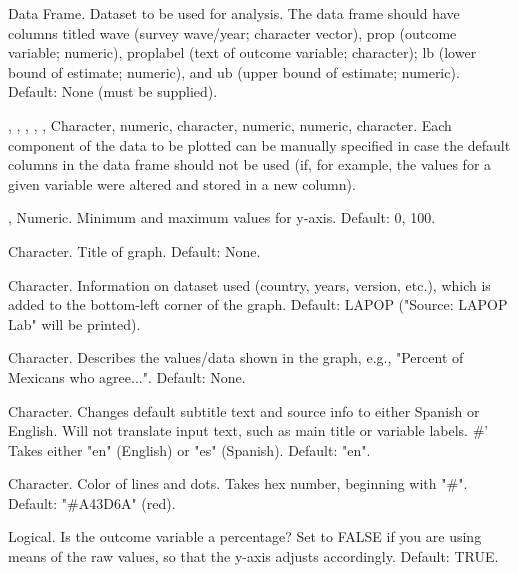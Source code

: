 \documentclass[a4paper]{book}
\begin{document}
\begin{Arguments}
\begin{ldescription}
\item[\code{data}] Data Frame. Dataset to be used for analysis.  The data frame should have columns
titled wave (survey wave/year; character vector), prop (outcome variable; numeric),
proplabel (text of outcome variable; character); lb (lower bound of estimate; numeric),
and ub (upper bound of estimate; numeric). Default: None (must be supplied).

\item[\code{wave\_var}, \code{outcome\_var}, \code{label\_var}, \code{lower\_bound}, \code{upper\_bound}, \code{point\_var}] Character, numeric, character,
numeric, numeric, character. Each component of the data to be plotted can be manually specified in case
the default columns in the data frame should not be used (if, for example, the values for a given
variable were altered and stored in a new column).

\item[\code{ymin}, \code{ymax}] Numeric.  Minimum and maximum values for y-axis. Default: 0, 100.

\item[\code{main\_title}] Character.  Title of graph.  Default: None.

\item[\code{source\_info}] Character.  Information on dataset used (country, years, version, etc.),
which is added to the bottom-left corner of the graph. Default: LAPOP ("Source: LAPOP Lab" will be printed).

\item[\code{subtitle}] Character.  Describes the values/data shown in the graph, e.g., "Percent of Mexicans who agree...".
Default: None.

\item[\code{lang}] Character.  Changes default subtitle text and source info to either Spanish or English.
Will not translate input text, such as main title or variable labels.  \#' Takes either "en" (English)
or "es" (Spanish).  Default: "en".

\item[\code{color\_scheme}] Character.  Color of lines and dots.  Takes hex number, beginning with "\#".
Default: "\#A43D6A" (red).

\item[\code{percentages}] Logical.  Is the outcome variable a percentage?  Set to FALSE if you are using
means of the raw values, so that the y-axis adjusts accordingly. Default: TRUE.


\end{ldescription}
\end{Arguments}
\end{document}
